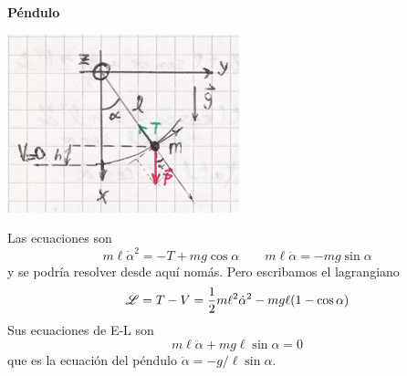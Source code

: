 \documentclass[10pt,oneside]{CBFT_book}
\begin{document}
\begin{ejemplo}{\bfseries Péndulo}

\includegraphics[scale=0.35]{images/fig_mc_pendulo_lag.jpg}

Las ecuaciones son 
\[
	m\ell \dot{\alpha}^2 = - T + m g \cos \alpha \qquad 
	m\ell \ddot{\alpha} = - m g \sin \alpha
\]
y se podría resolver desde aquí nomás. Pero escribamos el lagrangiano
\[
	\mathscr{L} = T-V = \frac 1 2 m \ell^2 \dot{\alpha}^2 - mg\ell(1-\cos \alpha)
\]
Sus ecuaciones de E-L son
\[
	m \ell \ddot{\alpha} + mg\ell \sin \alpha = 0
\]
que es la ecuación del péndulo $\ddot{\alpha} = -g/\ell \sin \alpha$.

\end{ejemplo}
\end{document}
